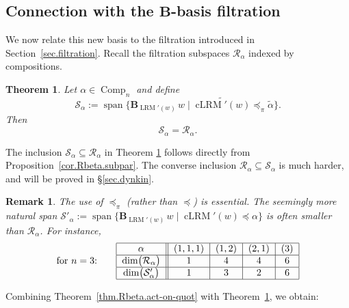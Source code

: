 \documentclass[submission]{FPSAC2026}
\newtheorem{theorem}{Theorem}
\newtheorem{remark}{Remark}
\newcommand{\Comp}{\operatorname{Comp}}
\begin{document}
\subsection{Connection with the $\mathbf{B}$-basis filtration}
\label{sec.rs}
We now relate this new basis to the filtration introduced in Section~\ref{sec.filtration}.  Recall the filtration subspaces $\mathcal{R}_\alpha$ indexed by compositions.


\begin{theorem}
\label{thm.LRM.filtbasis}
Let $\alpha\in\Comp_n$ and define
\[
\mathcal{S}_\alpha
 := \operatorname{span}\bigl\{
\mathbf{B}_{\operatorname{LRM}'(w)}\, w
 \;\big|\;
\widetilde{\operatorname{cLRM}'(w)}\preceq_\pi \widetilde{\alpha}
\bigr\}.
\]
Then
\[
\mathcal{S}_\alpha = \mathcal{R}_\alpha.
\]
\end{theorem}


The inclusion
$\mathcal{S}_\alpha \subseteq \mathcal{R}_\alpha$
in Theorem \ref{thm.LRM.filtbasis}
follows directly from Proposition~\ref{cor.Rbeta.subpar}.
The converse inclusion
$\mathcal{R}_\alpha \subseteq \mathcal{S}_\alpha$
is much harder, and will be proved in \S \ref{sec.dynkin}.

 
\begin{remark}
The use of $\preceq_\pi$ (rather than $\preceq$)
is essential.  
The seemingly more natural span
\(
\mathcal{S}'_\alpha
 :=
 \operatorname{span}\bigl\{
\mathbf{B}_{\operatorname{LRM}'(w)}\, w
\;\big|\;
\operatorname{cLRM}'(w)\preceq \alpha
\bigr\}
\)
is often smaller than $\mathcal{R}_\alpha$.
For instance,%
\[
\text{for $n = 3$:} \qquad
\begin{tabular}{|c||c|c|c|c|}
\hline
$\alpha$ & $(1,1,1)$ & $(1,2)$ & $(2,1)$ & $(3)$ \\
\hline
$\dim\bigl(\mathcal{R}_\alpha\bigr)$ & $1$ & $4$ & $4$ & $6$\\
\hline
$\dim\bigl(\mathcal{S}'_\alpha\bigr)$ & $1$ & $3$ & $2$ & $6$\\
\hline
\end{tabular}
\]
\end{remark}

Combining Theorem~\ref{thm.Rbeta.act-on-quot} with
Theorem~\ref{thm.LRM.filtbasis}, we obtain:
\end{document}
